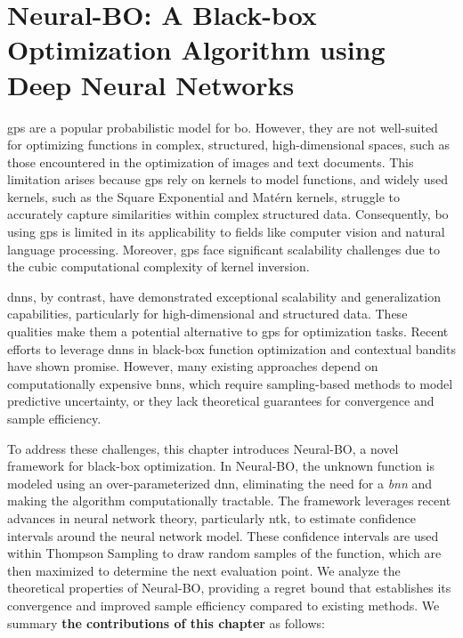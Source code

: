 \chapter{Neural-BO: A Black-box Optimization Algorithm using Deep Neural Networks} %
\label{chap:neural-bo}
\acfp{gp} are a popular probabilistic model for \ac{bo}. However, they are not well-suited for optimizing functions in complex, structured, high-dimensional spaces, such as those encountered in the optimization of images and text documents. This limitation arises because \acp{gp} rely on kernels to model functions, and widely used kernels, such as the Square Exponential and Matérn kernels, struggle to accurately capture similarities within complex structured data. Consequently, \ac{bo} using \acp{gp} is limited in its applicability to fields like computer vision and natural language processing. Moreover, \acp{gp} face significant scalability challenges due to the cubic computational complexity of kernel inversion.

\acfp{dnn}, by contrast, have demonstrated exceptional scalability and generalization capabilities, particularly for high-dimensional and structured data. These qualities make them a potential alternative to \acp{gp} for optimization tasks. Recent efforts to leverage \acp{dnn} in black-box function optimization and contextual bandits have shown promise. However, many existing approaches depend on computationally expensive \acfp{bnn}, which require sampling-based methods to model predictive uncertainty, or they lack theoretical guarantees for convergence and sample efficiency.

To address these challenges, this chapter introduces Neural-BO, a novel framework for black-box optimization. In Neural-BO, the unknown function is modeled using an over-parameterized \ac{dnn}, eliminating the need for a \emph{\acf{bnn}} and making the algorithm computationally tractable. The framework leverages recent advances in neural network theory, particularly \acf{ntk}, to estimate confidence intervals around the neural network model. These confidence intervals are used within Thompson Sampling to draw random samples of the function, which are then maximized to determine the next evaluation point. We analyze the theoretical properties of Neural-BO, providing a regret bound that establishes its convergence and improved sample efficiency compared to existing methods. We summary \textbf{the contributions of this chapter} as follows:


